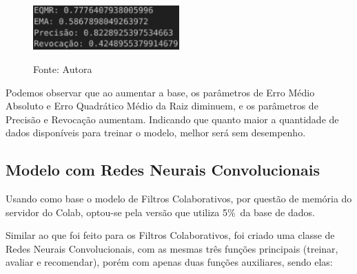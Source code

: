 \begin{itemize}
\begin{figure}[htbp]
        \vspace{2pt} %
        
        \includegraphics[width=0.5\textwidth]{figuras/fc-100.eps}
        
        \vspace{2pt} %
        
        \small Fonte: Autora
    \end{figure} 

\end{itemize}

Podemos observar que ao aumentar a base, os parâmetros de Erro Médio Absoluto e Erro Quadrático Médio da Raiz diminuem,
e os parâmetros de Precisão e Revocação aumentam. Indicando que quanto maior a quantidade de dados disponíveis para
treinar o modelo, melhor será sem desempenho.

\subsection{Modelo com Redes Neurais Convolucionais}\label{subsec:rnc}

Usando como base o modelo de Filtros Colaborativos, por questão de memória do servidor do Colab, optou-se pela
versão que utiliza 5\%\ da base de dados.

Similar ao que foi feito para os Filtros Colaborativos, foi criado uma classe de Redes Neurais Convolucionais, com as mesmas
três funções principais (treinar, avaliar e recomendar), porém com apenas duas funções auxiliares, sendo elas:

